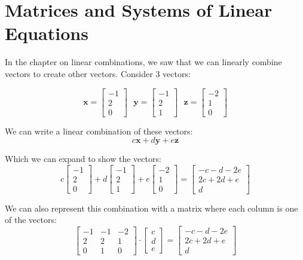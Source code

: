 \chapter{Matrices and Systems of Linear Equations}

In the chapter on linear combinations, we saw that we can linearly combine vectors to create other vectors. Consider 3 vectors:

$$\textbf{x} = \begin{bmatrix}
-1\\
2\\
0
\end{bmatrix}\text{ 	} \textbf{y} = \begin{bmatrix}
-1\\
2\\
1
\end{bmatrix}\text{ 	} \textbf{z} = \begin{bmatrix}
-2\\
1\\
0
\end{bmatrix}$$

We can write a linear combination of these vectors:
$$c\textbf{x} + d\textbf{y} + e\textbf{z}$$

Which we can expand to show the vectors:
$$c \begin{bmatrix}
-1\\
2\\
0
\end{bmatrix} + d \begin{bmatrix}
-1\\
2\\
1
\end{bmatrix} + e \begin{bmatrix}
-2\\
1\\
0
\end{bmatrix} = \begin{bmatrix}
-c - d - 2e\\
2c + 2d + e\\
d
\end{bmatrix}$$

We can also represent this combination with a matrix where each column is one of the vectors:
$$\begin{bmatrix}
-1 & -1 & -2\\
2 & 2 & 1\\
0 & 1 & 0
\end{bmatrix} \cdot \begin{bmatrix}
c\\
d\\
e
\end{bmatrix} = \begin{bmatrix}
-c - d - 2e\\
2c + 2d + e\\
d
\end{bmatrix}$$


